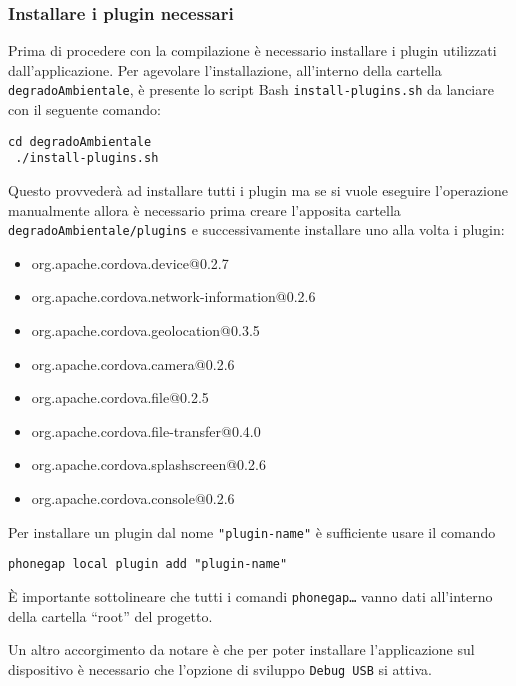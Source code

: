         \subsubsection{Installare i plugin necessari}
            Prima di procedere con la compilazione è necessario installare i 
            plugin utilizzati dall'applicazione. Per agevolare 
            l'installazione, all'interno della cartella 
            \texttt{degradoAmbientale}, è presente lo script Bash 
            \texttt{install-plugins.sh} da lanciare con il seguente comando:
            \begin{lstlisting}[language=plane]
 cd degradoAmbientale
 ./install-plugins.sh
            \end{lstlisting}
            Questo provvederà ad installare tutti i plugin ma se si vuole 
            eseguire l'operazione manualmente allora è necessario prima creare 
            l'apposita cartella \texttt{degradoAmbientale/plugins} e 
            successivamente installare uno alla volta i plugin:
            \begin{itemize}
                \item org.apache.cordova.device@0.2.7
                \item org.apache.cordova.network-information@0.2.6
                \item org.apache.cordova.geolocation@0.3.5
                \item org.apache.cordova.camera@0.2.6
                \item org.apache.cordova.file@0.2.5
                \item org.apache.cordova.file-transfer@0.4.0
                \item org.apache.cordova.splashscreen@0.2.6
                \item org.apache.cordova.console@0.2.6
            \end{itemize}
            Per installare un plugin dal nome \texttt{"plugin-name"} è 
            sufficiente usare il comando
            \begin{lstlisting}[language=plane]
 phonegap local plugin add "plugin-name"
            \end{lstlisting}
            
            È importante sottolineare che tutti i comandi
            \texttt{phonegap\ldots} vanno dati all'interno della cartella 
            ``root'' del progetto.
            
            Un altro accorgimento da notare è che per poter installare 
            l'applicazione sul dispositivo è necessario che l'opzione di 
            sviluppo \texttt{Debug USB} si attiva. 
            
